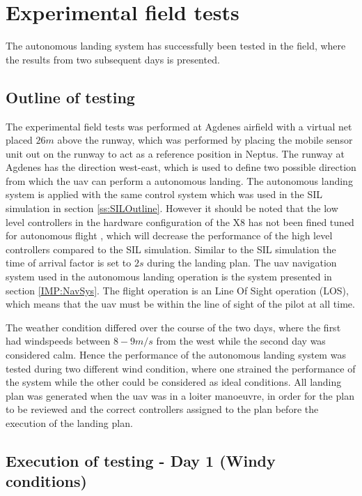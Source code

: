 \chapter{Experimental field tests}\label{Ch:ExperimentalTesting}
The autonomous landing system has successfully been tested in the field, where the results from two subsequent days is presented.
\section{Outline of testing}
The experimental field tests was performed at Agdenes airfield with a virtual net placed $26 m$ above the runway, which was performed by placing the mobile sensor unit out on the runway to act as a reference position in Neptus. The runway at Agdenes has the direction west-east, which is used to define two possible direction from which the \gls{uav} can perform a autonomous landing. The autonomous landing system is applied with the same control system which was used in the SIL simulation in section \ref{ss:SILOutline}. However it should be noted that the low level controllers in the hardware configuration of the X8 has not been fined tuned for autonomous flight \citep{Sigurd}, which will decrease the performance of the high level controllers compared to the SIL simulation. Similar to the SIL simulation the time of arrival factor is set to $2 s$ during the landing plan. The \gls{uav} navigation system used in the autonomous landing operation is the system presented in section \ref{IMP:NavSys}. The flight operation is an Line Of Sight operation (LOS), which means that the \gls{uav} must be within the line of sight of the pilot at all time.

The weather condition differed over the course of the two days, where the first had windspeeds between $8-9 m/s$ from the west while the second day was considered calm. Hence the performance of the autonomous landing system was tested during two different wind condition, where one strained the performance of the system while the other could be considered as ideal conditions. All landing plan was generated when the \gls{uav} was in a loiter manoeuvre, in order for the plan to be reviewed and the correct controllers assigned to the plan before the execution of the landing plan.
\section{Execution of testing - Day 1 (Windy conditions)}
